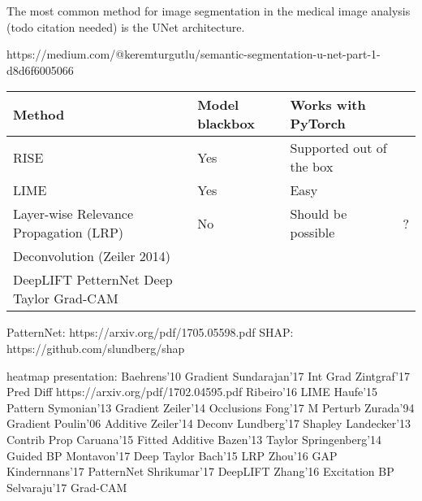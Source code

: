 The most common method for image segmentation in the medical image analysis (todo citation needed) is the UNet\cite{todo} architecture.



https://medium.com/@keremturgutlu/semantic-segmentation-u-net-part-1-d8d6f6005066


\begin{tabular}{|l|l|l|l|}
\hline
 \textbf{Method} & \textbf{Model blackbox} & \textbf{Works with PyTorch} \\ \hline
 RISE & Yes & Supported out of the box \\ \hline
 LIME & Yes & Easy \\ \hline
 Layer-wise Relevance Propagation (LRP) & No & Should be possible & ? \\ \hline
 Deconvolution (Zeiler 2014) \\ \hline
 DeepLIFT
 PetternNet
 Deep Taylor
 Grad-CAM
 
\end{tabular}

PatternNet: https://arxiv.org/pdf/1705.05598.pdf
SHAP: https://github.com/slundberg/shap

heatmap presentation:
Baehrens'10 Gradient
Sundarajan'17 Int Grad
Zintgraf'17 Pred Diff  https://arxiv.org/pdf/1702.04595.pdf
Ribeiro'16 LIME
Haufe'15 Pattern
Symonian'13 Gradient
Zeiler'14 Occlusions
Fong'17 M Perturb
Zurada'94 Gradient
Poulin'06 Additive
Zeiler'14 Deconv
Lundberg'17 Shapley
Landecker'13 Contrib Prop
Caruana'15 Fitted Additive
Bazen'13 Taylor
Springenberg'14 Guided BP
Montavon'17 Deep Taylor
Bach'15 LRP
Zhou'16 GAP
Kindernnans'17 PatternNet
Shrikumar'17 DeepLIFT
Zhang'16 Excitation BP
Selvaraju'17 Grad-CAM
